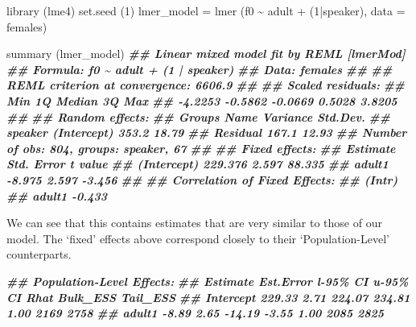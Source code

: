 \documentclass[
]{book}
\newenvironment{Shaded}{\begin{snugshade}}{\end{snugshade}}
\newcommand{\AttributeTok}[1]{\textcolor[rgb]{0.77,0.63,0.00}{#1}}
\newcommand{\DecValTok}[1]{\textcolor[rgb]{0.00,0.00,0.81}{#1}}
\newcommand{\DocumentationTok}[1]{\textcolor[rgb]{0.56,0.35,0.01}{\textbf{\textit{#1}}}}
\newcommand{\FunctionTok}[1]{\textcolor[rgb]{0.00,0.00,0.00}{#1}}
\newcommand{\NormalTok}[1]{#1}
\newcommand{\OtherTok}[1]{\textcolor[rgb]{0.56,0.35,0.01}{#1}}
\newcommand{\SpecialCharTok}[1]{\textcolor[rgb]{0.00,0.00,0.00}{#1}}
\begin{document}
\begin{Shaded}
\begin{Highlighting}[]
\FunctionTok{library}\NormalTok{ (lme4)}
\FunctionTok{set.seed}\NormalTok{ (}\DecValTok{1}\NormalTok{)}
\NormalTok{lmer\_model }\OtherTok{=} \FunctionTok{lmer}\NormalTok{ (f0 }\SpecialCharTok{\textasciitilde{}}\NormalTok{ adult }\SpecialCharTok{+}\NormalTok{ (}\DecValTok{1}\SpecialCharTok{|}\NormalTok{speaker), }\AttributeTok{data =}\NormalTok{ females)}

\FunctionTok{summary}\NormalTok{ (lmer\_model)}
\DocumentationTok{\#\# Linear mixed model fit by REML [\textquotesingle{}lmerMod\textquotesingle{}]}
\DocumentationTok{\#\# Formula: f0 \textasciitilde{} adult + (1 | speaker)}
\DocumentationTok{\#\#    Data: females}
\DocumentationTok{\#\# }
\DocumentationTok{\#\# REML criterion at convergence: 6606.9}
\DocumentationTok{\#\# }
\DocumentationTok{\#\# Scaled residuals: }
\DocumentationTok{\#\#     Min      1Q  Median      3Q     Max }
\DocumentationTok{\#\# {-}4.2253 {-}0.5862 {-}0.0669  0.5028  3.8205 }
\DocumentationTok{\#\# }
\DocumentationTok{\#\# Random effects:}
\DocumentationTok{\#\#  Groups   Name        Variance Std.Dev.}
\DocumentationTok{\#\#  speaker  (Intercept) 353.2    18.79   }
\DocumentationTok{\#\#  Residual             167.1    12.93   }
\DocumentationTok{\#\# Number of obs: 804, groups:  speaker, 67}
\DocumentationTok{\#\# }
\DocumentationTok{\#\# Fixed effects:}
\DocumentationTok{\#\#             Estimate Std. Error t value}
\DocumentationTok{\#\# (Intercept)  229.376      2.597  88.335}
\DocumentationTok{\#\# adult1        {-}8.975      2.597  {-}3.456}
\DocumentationTok{\#\# }
\DocumentationTok{\#\# Correlation of Fixed Effects:}
\DocumentationTok{\#\#        (Intr)}
\DocumentationTok{\#\# adult1 {-}0.433}
\end{Highlighting}
\end{Shaded}

We can see that this contains estimates that are very similar to those of our model. The `fixed' effects above correspond closely to their `Population-Level' counterparts.

\begin{Shaded}
\begin{Highlighting}[]
\DocumentationTok{\#\# Population{-}Level Effects: }
\DocumentationTok{\#\#           Estimate Est.Error l{-}95\% CI u{-}95\% CI Rhat Bulk\_ESS Tail\_ESS}
\DocumentationTok{\#\# Intercept   229.33      2.71   224.07   234.81 1.00     2169     2758}
\DocumentationTok{\#\# adult1       {-}8.89      2.65   {-}14.19    {-}3.55 1.00     2085     2825}
\end{Highlighting}
\end{Shaded}
\end{document}
